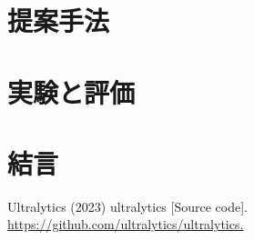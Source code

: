 \documentclass[10pt]{jarticle}
\begin{document}
    \section{提案手法}%
     
    \section{実験と評価}%
      
    \section{結\hspace{2zw}言}%

    \vspace{5truemm}
    {\footnotesize
        \begin{thebibliography}{99}

            Ultralytics (2023) ultralytics [Source code]. \url{https://github.com/ultralytics/ultralytics.}
            
        \end{thebibliography}
    }
    \normalsize
    
\end{document}

